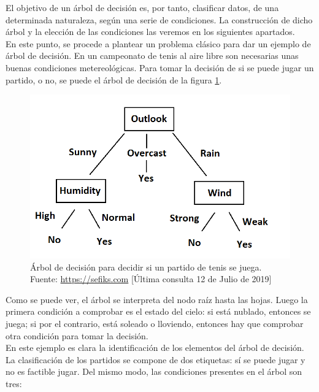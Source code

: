 			El objetivo de un \'arbol de decisi\'on es, por tanto, clasificar datos, de una determinada naturaleza, seg\'un una serie de condiciones. La construcci\'on de dicho \'arbol y la elecci\'on de las condiciones las veremos en los siguientes apartados.\\
		
			En este punto, se procede a plantear un problema cl\'asico para dar un ejemplo de \'arbol de decisi\'on. En un campeonato de tenis al aire libre son necesarias unas buenas condiciones metereol\'ogicas. Para tomar la decisi\'on de si se puede jugar un partido, o no, se puede el \'arbol de decisi\'on de la figura \ref{fig:tenis}.
			
			\begin{figure}[H]
    			\centering
    			\includegraphics[scale=0.5]{imagenes/tree.png}
    			\caption[\'Arbol de decisi\'on para jugar partido de tenis.]{\'Arbol de decisi\'on para decidir si un partido de tenis se juega.\\ Fuente: \url{https://sefiks.com} [\'Ultima consulta 12 de Julio de 2019]}
    			\label{fig:tenis}
		    \end{figure}
			
			Como se puede ver, el \'arbol se interpreta del nodo ra\'iz hasta las hojas. Luego la primera condici\'on a comprobar es el estado del cielo: si est\'a nublado, entonces se juega; si por el contrario, est\'a soleado o lloviendo, entonces hay que comprobar otra condici\'on para tomar la decisi\'on.\\
			
			En este ejemplo es clara la identificaci\'on de los elementos del \'arbol de decisi\'on. La clasificaci\'on de los partidos se compone de dos etiquetas: s\'i se puede jugar y no es factible jugar. Del mismo modo, las condiciones presentes en el \'arbol son tres:\\
			
